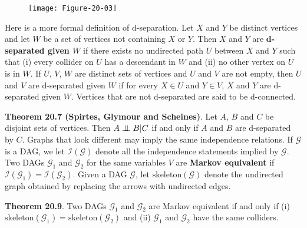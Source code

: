 \begin{figure}[H]
\centering
\texttt{[image: Figure-20-03]}
\end{figure}

Here is a more formal definition of d-separation. Let \(X\) and \(Y\) be
distinct vertices and let \(W\) be a set of vertices not containing
\(X\) or \(Y\). Then \(X\) and \(Y\) are \textbf{d-separated given
\(W\)} if there exists no undirected path \(U\) between \(X\) and \(Y\)
such that (i) every collider on \(U\) has a descendant in \(W\) and (ii)
no other vertex on \(U\) is in \(W\). If \(U\), \(V\), \(W\) are
distinct sets of vertices and \(U\) and \(V\) are not empty, then \(U\)
and \(V\) are d-separated given \(W\) if for every \(X \in U\) and
\(Y \in V\), \(X\) and \(Y\) are d-separated given \(W\). Vertices that
are not d-separated are said to be d-connected.

\textbf{Theorem 20.7 (Spirtes, Glymour and Scheines)}. Let \(A\), \(B\)
and \(C\) be disjoint sets of vertices. Then \(A \perp\!\!\!\perp B | C\) if
and only if \(A\) and \(B\) are d-separated by \(C\).
Graphs that look different may imply the same independence relations. If
\(\mathcal{G}\) is a DAG, we let \(\mathcal{I}(\mathcal{G})\) denote all
the independence statements implied by \(\mathcal{G}\). Two DAGs
\(\mathcal{G}_{1}\) and \(\mathcal{G}_{2}\) for the same variables \(V\) are
\textbf{Markov equivalent} if
\(\mathcal{I}(\mathcal{G}_{1}) = \mathcal{I}(\mathcal{G}_{2})\). Given a DAG
\(\mathcal{G}\), let \(\text{skeleton}(\mathcal{G})\) denote the
undirected graph obtained by replacing the arrows with undirected edges.

\textbf{Theorem 20.9}. Two DAGs \(\mathcal{G}_{1}\) and \(\mathcal{G}_{2}\)
are Markov equivalent if and only if (i)
\(\text{skeleton}(\mathcal{G}_{1}) = \text{skeleton}(\mathcal{G}_{2})\) and
(ii) \(\mathcal{G}_{1}\) and \(\mathcal{G}_{2}\) have the same colliders.

